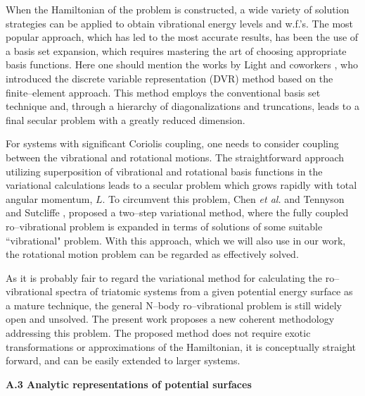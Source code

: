 When the Hamiltonian of the problem is constructed, a wide variety
of solution strategies can be applied to obtain vibrational energy
levels and w.f.'s. The most popular approach, which has led
to the most accurate results, has been the use of a basis set
expansion, which requires mastering the art of choosing appropriate
basis functions. Here one should mention the works by Light and
coworkers \cite{ref:j25,ref:j45,ref:j46}, who introduced the
discrete variable representation (DVR) method based on  the 
finite--element approach. This method employs 
the conventional basis set
technique and, through a hierarchy of diagonalizations and truncations,
leads to a final secular problem with a greatly reduced dimension.

For systems with significant Coriolis coupling, one needs to
consider coupling between the vibrational and rotational motions.
The straightforward approach utilizing superposition of vibrational
and rotational basis functions in the variational calculations
leads to a secular problem which grows rapidly with total angular 
momentum, $L$. To circumvent this problem, Chen {\it et al.} and
Tennyson and Sutcliffe \cite{ref:j22,ref:j50}, proposed a
two--step variational method, where the fully coupled ro--vibrational
problem is expanded in terms of solutions of some suitable
``vibrational" problem. 
With this approach, which we will also use in our work, the 
rotational motion problem can be regarded as effectively solved.


As it is probably fair to regard the variational method for
calculating the ro--vibrational spectra of triatomic systems
from a given potential energy surface as a mature technique,
the general N--body ro--vibrational problem is still widely open
and unsolved.
The present work proposes a new coherent
methodology addressing this problem.
The proposed method does not require exotic
transformations or approximations of the Hamiltonian, 
it is conceptually
straight forward, and can be easily extended to larger systems.

\vspace{2mm}
\noindent
{\bf A.3 Analytic representations of potential surfaces}

